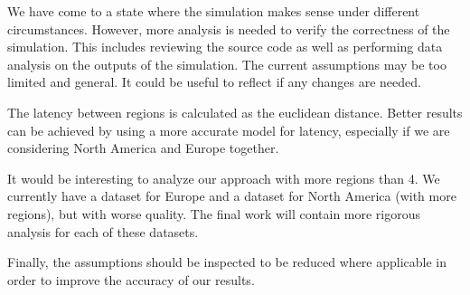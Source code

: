 We have come to a state where the simulation makes sense under different circumstances. However, more analysis is needed to verify the correctness of the simulation. This includes reviewing the source code as well as performing data analysis on the outputs of the simulation. The current assumptions may be too limited and general. It could be useful to reflect if any changes are needed.

The latency between regions is calculated as the euclidean distance. Better results can be achieved by using a more accurate model for latency, especially if we are considering North America and Europe together.

It would be interesting to analyze our approach with more regions than 4. We currently have a dataset for Europe and a dataset for North America (with more regions), but with worse quality. The final work will contain more rigorous analysis for each of these datasets.

Finally, the assumptions should be inspected to be reduced where applicable in order to improve the accuracy of our results.  